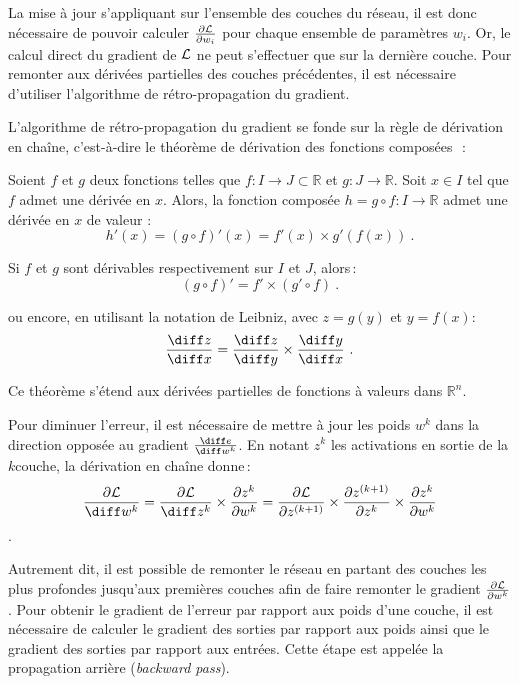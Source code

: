 La mise à jour s'appliquant sur l'ensemble des couches du réseau, il est donc nécessaire de pouvoir calculer $\frac{\partial \mathcal{L}}{\partial w_i}$ pour chaque ensemble de paramètres $w_i$. Or, le calcul direct du gradient de $\mathcal{L}$ ne peut s'effectuer que sur la dernière couche. Pour remonter aux dérivées partielles des couches précédentes, il est nécessaire d'utiliser l'algorithme de rétro-propagation du gradient.

L'algorithme de rétro-propagation du gradient se fonde sur la règle de dérivation en chaîne, c'est-à-dire le théorème de dérivation des fonctions composées~\cite{lhospital_analyse_1716,lagrange_theorie_1797}\,:
\begin{theorem}
Soient $f$ et $g$ deux fonctions telles que $f : I \rightarrow J \subset \mathbb{R}$ et $g : J \rightarrow \mathbb{R}$. Soit $x \in I$ tel que $f$ admet une dérivée en $x$. Alors, la fonction composée $h = g \circ f : I \rightarrow \mathbb{R}$ admet une dérivée en $x$ de valeur :
$$h'(x) = (g \circ f)'(x) = f'(x) \times g'(f(x))~.$$

Si $f$ et $g$ sont dérivables respectivement sur $I$ et $J$, alors\,:
$$(g \circ f)' = f' \times (g' \circ f)~.$$

ou encore, en utilisant la notation de Leibniz, avec $z = g(y)$ et $y = f(x)$:
$$\frac{\diff z}{\diff x} = \frac{\diff z}{\diff y} \times \frac{\diff y}{\diff x}~.$$
\end{theorem}

Ce théorème s'étend aux dérivées partielles de fonctions à valeurs dans $\mathbb{R}^n$.

Pour diminuer l'erreur, il est nécessaire de mettre à jour les poids $w^k$ dans la direction opposée au gradient $\frac{\diff e}{\diff w^k}$. En notant $z^k$ les activations en sortie de la $k$\ieme couche, la dérivation en chaîne donne\,:
$$\frac{\partial \L}{\diff w^k} = \frac{\partial \L}{\diff z^k} \times \frac{\partial z^k}{\partial w^k} = \frac{\partial \L}{\partial z^{(k+1)}} \times \frac{\partial z^{(k+1)}}{\partial z^k} \times \frac{\partial z^k}{\partial w^k}$$.

Autrement dit, il est possible de remonter le réseau en partant des couches les plus profondes jusqu'aux premières couches afin de faire remonter le gradient $\frac{\partial \mathcal{L}}{\partial w^k}$. Pour obtenir le gradient de l'erreur par rapport aux poids d'une couche, il est nécessaire de calculer le gradient des sorties par rapport aux poids ainsi que le gradient des sorties par rapport aux entrées. Cette étape est appelée la propagation arrière (\emph{backward pass}).

